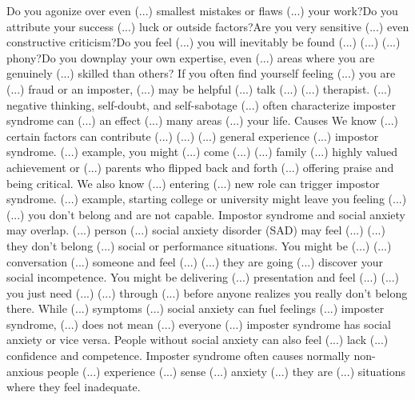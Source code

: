 \documentclass[14pt,a4paper]{extarticle}
\begin{document}
Do you agonize over even (...) smallest mistakes or flaws (...) your work?Do you attribute your success (...) luck or outside factors?Are you very sensitive (...) even constructive criticism?Do you feel (...) you will inevitably be found (...) (...) (...) phony?Do you downplay your own expertise, even (...) areas where you are genuinely (...) skilled than others?
\newline\newline 
If you often find yourself feeling (...) you are (...) fraud or an imposter, (...) may be helpful (...) talk (...) (...) therapist. (...) negative thinking, self-doubt, and self-sabotage (...) often characterize imposter syndrome can (...) an effect (...) many areas (...) your life.
\newline\newline  Causes \newline\newline 
We know (...) certain factors can contribute (...) (...) (...) general experience (...) impostor syndrome. (...) example, you might (...) come (...) (...) family (...) highly valued achievement or (...) parents who flipped back and forth (...) offering praise and being critical.
\newline\newline 
We also know (...) entering (...) new role can trigger impostor syndrome. (...) example, starting college or university might leave you feeling (...) (...) you don't belong and are not capable.
\newline\newline 
Impostor syndrome and social anxiety may overlap. (...) person (...) social anxiety disorder (SAD) may feel (...) (...) they don't belong (...) social or performance situations.
\newline\newline 
You might be (...) (...) conversation (...) someone and feel (...) (...) they are going (...) discover your social incompetence. You might be delivering (...) presentation and feel (...) (...) you just need (...) (...) through (...) before anyone realizes you really don't belong there.
\newline\newline 
While (...) symptoms (...) social anxiety can fuel feelings (...) imposter syndrome, (...) does not mean (...) everyone (...) imposter syndrome has social anxiety or vice versa. People without social anxiety can also feel (...) lack (...) confidence and competence. Imposter syndrome often causes normally non-anxious people (...) experience (...) sense (...) anxiety (...) they are (...) situations where they feel inadequate.
\end{document}
